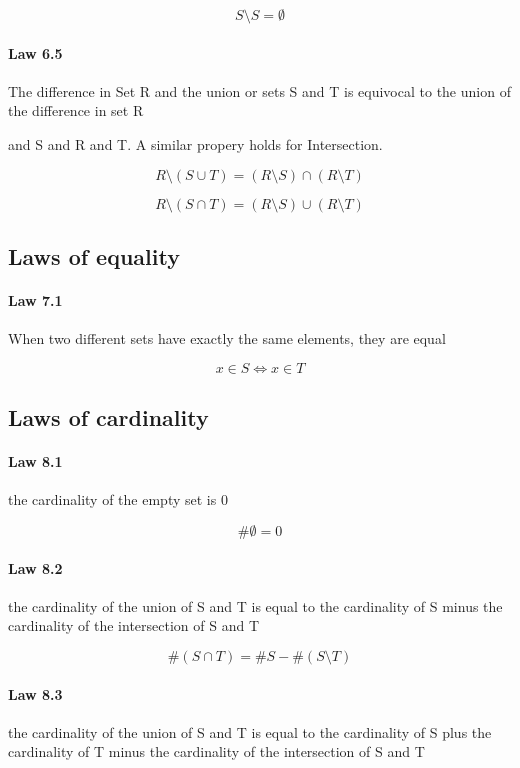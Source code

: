 \documentclass[twocolumn]{article}
\begin{document}
$$ S \setminus S = \emptyset  $$

\paragraph{Law 6.5} The difference in Set R and the union or sets S and T is equivocal to the union of the difference in set R

and S and R and T. A similar propery holds for Intersection.

$$ R \setminus (S  \cup  T) = (R \setminus S)  \cap  (R \setminus T) $$

$$ R \setminus (S  \cap  T) = (R \setminus S)  \cup  (R \setminus T) $$

\subsection{Laws of equality}

\paragraph{Law 7.1} When two different sets have exactly the same elements, they are equal

$$ x \in S\iff x \in T $$

\clearpage

\subsection{Laws of cardinality}

\paragraph{Law 8.1} the cardinality of the empty set is 0

$$ \# \emptyset = 0 $$

\paragraph{Law 8.2} the cardinality of the union of S and T is equal to the cardinality of S minus the cardinality of the intersection of S and T

$$ \#(S  \cap  T) = \#S - \#(S\setminus T) $$

\paragraph{Law 8.3} the cardinality of the union of S and T is equal to the cardinality of S plus the cardinality of T minus the cardinality of the intersection of S and T
\end{document}
